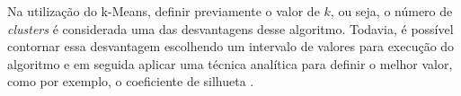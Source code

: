 Na utilização do k-Means, definir previamente o valor de $k$, ou seja, o número de \textit{clusters} é considerada uma das desvantagens desse algoritmo. Todavia,
é possível contornar essa desvantagem escolhendo um intervalo de valores para execução do algoritmo e em seguida aplicar
uma técnica analítica para definir o melhor valor, como por exemplo, o coeficiente de silhueta \cite{han2011data}.



% 
% 
% 
% 
% 
% 
% 
% 
